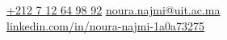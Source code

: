 \documentclass[darkxp]{../../lib/physics}
\newlength{\rightcolwidth}
\begin{document}
\begin{paracol}{2}
\setlength{\parindent}{0pt}
\begin{minipage}[t]{\rightcolwidth}
\begin{center}\fontfamily{\sfdefault}\selectfont \color{black!70}
{\href{callto:+212712649892}{ \textcolor{black!70}{+212 7 12 64 98 92}}
{\href{mailto:noura.najmi@uit.ac.ma}{ \textcolor{black!70}{noura.najmi@uit.ac.ma}}\\
\href{https://www.linkedin.com/in/noura-najmi-1a0a73275/}{ \textcolor{black!70}{linkedin.com/in/noura-najmi-1a0a73275}} 
}


}
\end{center}\vspace{-0.5em} %
\end{minipage}


\end{paracol}
\end{document}

